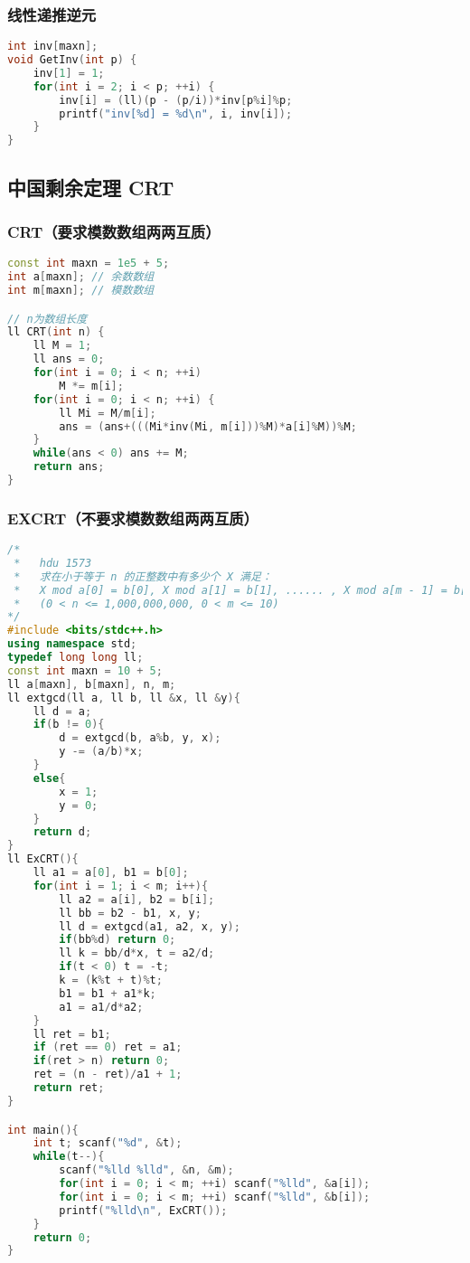 \subsubsection{线性递推逆元}

\begin{lstlisting}[language=C++]
int inv[maxn];
void GetInv(int p) {
    inv[1] = 1;
    for(int i = 2; i < p; ++i) {
        inv[i] = (ll)(p - (p/i))*inv[p%i]%p;
        printf("inv[%d] = %d\n", i, inv[i]);
    }
}
\end{lstlisting}

\subsection{中国剩余定理 CRT}

\subsubsection{CRT（要求模数数组两两互质）}

\begin{lstlisting}[language=C++]
const int maxn = 1e5 + 5;
int a[maxn]; // 余数数组
int m[maxn]; // 模数数组

// n为数组长度
ll CRT(int n) {
    ll M = 1;
    ll ans = 0;
    for(int i = 0; i < n; ++i)
        M *= m[i];
    for(int i = 0; i < n; ++i) {
        ll Mi = M/m[i];
        ans = (ans+(((Mi*inv(Mi, m[i]))%M)*a[i]%M))%M;
    }
    while(ans < 0) ans += M;
    return ans;
}
\end{lstlisting}

\subsubsection{EXCRT（不要求模数数组两两互质）}

\begin{lstlisting}[language=C++]
/*
 *   hdu 1573
 *   求在小于等于 n 的正整数中有多少个 X 满足：
 *   X mod a[0] = b[0], X mod a[1] = b[1], ...... , X mod a[m - 1] = b[m - 1]
 *   (0 < n <= 1,000,000,000, 0 < m <= 10)
*/
#include <bits/stdc++.h>
using namespace std;
typedef long long ll;
const int maxn = 10 + 5;
ll a[maxn], b[maxn], n, m;
ll extgcd(ll a, ll b, ll &x, ll &y){
    ll d = a;
    if(b != 0){
        d = extgcd(b, a%b, y, x);
        y -= (a/b)*x;
    }
    else{
        x = 1;
        y = 0;
    }
    return d;
}
ll ExCRT(){
    ll a1 = a[0], b1 = b[0];
    for(int i = 1; i < m; i++){
        ll a2 = a[i], b2 = b[i];
        ll bb = b2 - b1, x, y;
        ll d = extgcd(a1, a2, x, y);
        if(bb%d) return 0;
        ll k = bb/d*x, t = a2/d;
        if(t < 0) t = -t;
        k = (k%t + t)%t;
        b1 = b1 + a1*k;
        a1 = a1/d*a2;
    }
    ll ret = b1;
    if (ret == 0) ret = a1;
    if(ret > n) return 0;
    ret = (n - ret)/a1 + 1;
    return ret;
}

int main(){
    int t; scanf("%d", &t);
    while(t--){
        scanf("%lld %lld", &n, &m);
        for(int i = 0; i < m; ++i) scanf("%lld", &a[i]);
        for(int i = 0; i < m; ++i) scanf("%lld", &b[i]);
        printf("%lld\n", ExCRT());
    }
    return 0;
}
\end{lstlisting}

